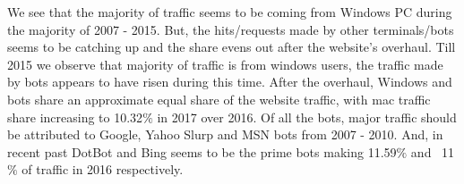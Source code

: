 We see that the majority of traffic seems to be coming from Windows PC during the majority of 2007 - 2015. But, the hits/requests made by other terminals/bots seems to be catching up and the share evens out after the website’s overhaul. Till 2015 we observe that majority of traffic is from windows users, the traffic made by bots appears to have risen during this time. After the overhaul, Windows and bots share an approximate equal share of the website traffic, with mac traffic share increasing to 10.32$\%$ in 2017 over 2016. 
Of all the bots, major traffic should be attributed to Google, Yahoo Slurp and MSN bots from 2007 - 2010. And, in recent past DotBot and Bing seems to be the prime bots making 11.59$\%$ and ~11$\%$ of traffic in 2016 respectively.
